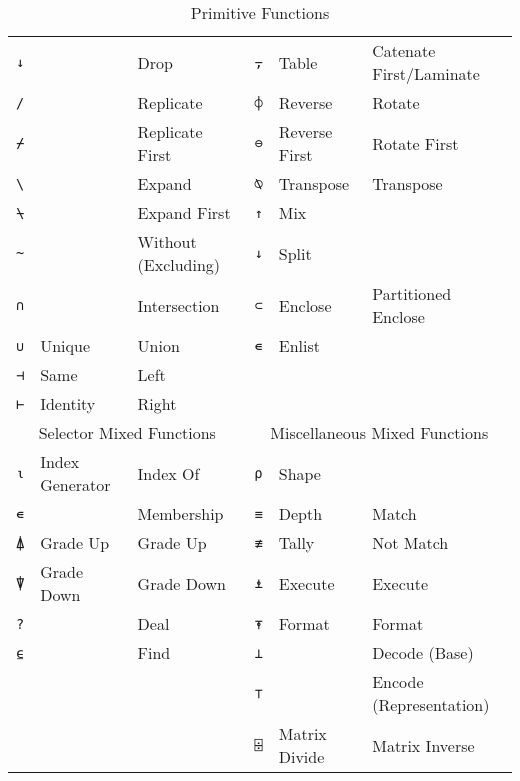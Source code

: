 \documentclass[numbers,9pt]{sigplanconf}
\begin{document}
\begin{table*}
\begin{tabular}{cllcll}
\texttt{↓}               &          & Drop &
\texttt{⍪} & Table         & Catenate First/Laminate \\
\texttt{/}               &          & Replicate &
\texttt{⌽} & Reverse       & Rotate \\
\texttt{⌿}               &          & Replicate First &
\texttt{⊖} & Reverse First & Rotate First \\
\texttt{\textbackslash}  &          & Expand &
\texttt{⍉} & Transpose     & Transpose \\
\texttt{⍀}               &          & Expand First &
\texttt{↑} & Mix           & \\
\texttt{\textasciitilde} &          & Without (Excluding) &
\texttt{↓} & Split         & \\
\texttt{∩}               &          & Intersection &
\texttt{⊂} & Enclose       & Partitioned Enclose \\
\texttt{∪}               & Unique   & Union &
\texttt{∊} & Enlist        & \\
\texttt{⊣}               & Same     & Left \\
\texttt{⊢}               & Identity & Right\\
\midrule
\multicolumn{3}{c}{Selector Mixed Functions} &
\multicolumn{3}{c}{Miscellaneous Mixed Functions} \\
\cmidrule(r){1-3} \cmidrule(l){4-6}
\texttt{⍳} & Index Generator & Index Of &
\texttt{⍴} & Shape         & \\
\texttt{∊} &                 & Membership &
\texttt{≡} & Depth         & Match \\
\texttt{⍋} & Grade Up        & Grade Up &
\texttt{≢} & Tally         & Not Match \\
\texttt{⍒} & Grade Down      & Grade Down &
\texttt{⍎} & Execute       & Execute \\
\texttt{?} &                 & Deal &
\texttt{⍕} & Format        & Format \\
\texttt{⍷} &                 & Find &
\texttt{⊥} &               & Decode (Base) \\
& & & \texttt{⊤} &               & Encode (Representation) \\
& & & \texttt{⌹} & Matrix Divide & Matrix Inverse \\
\end{tabular}
\caption{Primitive Functions}
\label{tab:scalarprims}
\end{table*}
\end{document}
